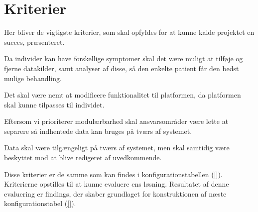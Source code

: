 \section{Kriterier}\label{firstsubseckriterier}
Her bliver de vigtigste kriterier, som skal opfyldes for at kunne kalde projektet en succes, præsenteret.

\begin{description}[style=nextline]
	\item[Modulær] 
	Da individer kan have forskellige symptomer skal det være muligt at tilføje og fjerne datakilder, samt analyser af disse, så den enkelte patient får den bedst mulige behandling.
	\item[Fleksibel]
	Det skal være nemt at modificere funktionalitet til platformen, da platformen skal kunne tilpasses til individet.
	\item[Kombinerbar] Eftersom vi prioriterer modulærbarhed skal ansvarsområder være lette at separere så indhentede data kan bruges på tværs af systemet.
	\item[Kommunikativ] Data skal være tilgængeligt på tværs af systemet, men skal samtidig være beskyttet mod at blive redigeret af uvedkommende.
\end{description}
Disse kriterier er de samme som kan findes i konfigurationstabellen (\cref{}).
Kriterierne opstilles til at kunne evaluere ens løsning.
Resultatet af denne evaluering er findings, der skaber grundlaget for konstruktionen af næste konfigurationstabel (\cref{}).


